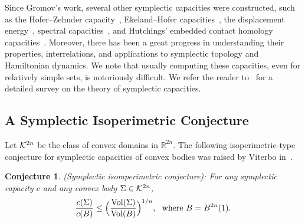 \documentclass[11pt]{article}
\newtheorem{conj}[lemma]{Conjecture}
\begin{document}
Since Gromov's work, several other symplectic capacities were constructed, such as the Hofer--Zehnder capacity~\cite{HZ},  Ekeland--Hofer capacities~\cite{EH}, the displacement
energy~\cite{H1}, spectral capacities~\cite{FGS,Oh,V2}, and Hutchings' embedded contact
homology capacities~\cite{Hut}.  
Moreover, there has been a great
progress in understanding their properties, interrelations, and
applications to symplectic topology and Hamiltonian dynamics. We note that usually computing these capacities, even for relatively simple sets, is notoriously difficult.
We refer the reader to~\cite{CHLS} for a detailed
survey on the theory of symplectic capacities.




\subsection{A Symplectic Isoperimetric Conjecture}

Let ${\cal K}^{2n}$ be the class of convex domains in ${\mathbb R}^{2n}$.  
The following isoperimetric-type conjecture for symplectic capacities of convex bodies was raised by Viterbo in~\cite{V}.
\begin{conj}(Symplectic isomperimetric conjecture): \label{iso-per-conj}
For any symplectic capacity $c$ and any convex body $\Sigma \in {\cal K}^{2n}$, 
\begin{equation} \label{ineq-vitconj} {\frac {c(\Sigma)} {c(B)}} \leq \Bigl (
{\frac {{\rm Vol}(\Sigma)} {{\rm Vol}(B)}} \Bigr )^{1/n}, \ \ {\rm where}
\ B = B^{2n}(1). \end{equation}
\end{conj}
\end{document}

